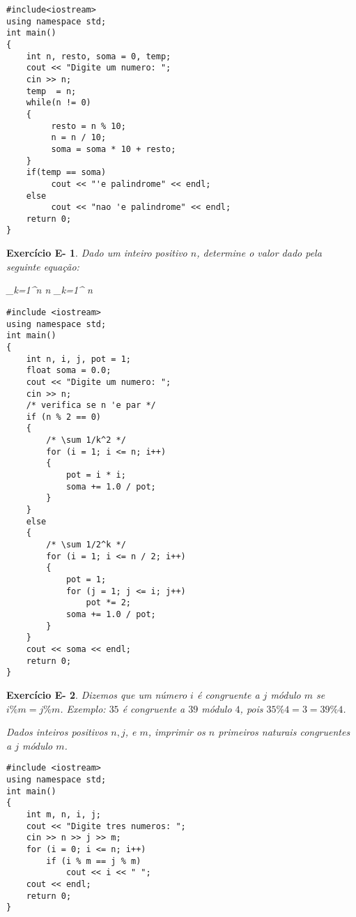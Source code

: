 \documentclass[a4paper]{article}
\newtheorem{eex}{Exerc\'icio E-}
\begin{document}
\begin{sol}
\begin{lstlisting}
#include<iostream>
using namespace std;
int main()
{
    int n, resto, soma = 0, temp;
    cout << "Digite um numero: ";
    cin >> n;
    temp  = n;
    while(n != 0)
    {
         resto = n % 10;
         n = n / 10;
         soma = soma * 10 + resto;
    }
    if(temp == soma)
         cout << "'e palindrome" << endl;
    else
         cout << "nao 'e palindrome" << endl;
    return 0;
}
\end{lstlisting}
\end{sol}

\begin{eex}
Dado um inteiro positivo $n$, determine o valor dado pela seguinte equação:

{\sum_{k=1}^n }
{n }
{\sum_{k=1}^{}}
{n }
\end{eex}

\begin{sol}
\begin{lstlisting}
#include <iostream>
using namespace std;
int main()
{
    int n, i, j, pot = 1;
    float soma = 0.0;
    cout << "Digite um numero: ";
    cin >> n;
    /* verifica se n 'e par */
    if (n % 2 == 0)
    {
        /* \sum 1/k^2 */
        for (i = 1; i <= n; i++)
        {
            pot = i * i;
            soma += 1.0 / pot;
        }
    }
    else
    {
        /* \sum 1/2^k */
        for (i = 1; i <= n / 2; i++)
        {
            pot = 1;
            for (j = 1; j <= i; j++)
                pot *= 2;
            soma += 1.0 / pot;
        }
    }
    cout << soma << endl;
    return 0;
}
\end{lstlisting}
\end{sol}

\begin{eex}
Dizemos que um número $i$ é congruente a $j$ módulo $m$ se $i\% m = j \% m$. Exemplo: $35$ é congruente a $39$ módulo $4$, pois $35\% 4 = 3 = 39 \% 4$.

Dados inteiros positivos $n, j$, e $m$, imprimir os $n$ primeiros naturais congruentes a $j$ módulo $m$.
\end{eex}

\begin{sol}
\begin{lstlisting}
#include <iostream>
using namespace std;
int main()
{
    int m, n, i, j;
    cout << "Digite tres numeros: ";
    cin >> n >> j >> m;
    for (i = 0; i <= n; i++)
        if (i % m == j % m)
            cout << i << " ";
    cout << endl;
    return 0;
}
\end{lstlisting}
\end{sol}
\end{document}
